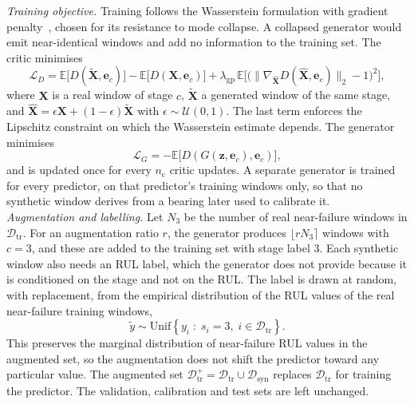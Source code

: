 \textit{Training objective.} Training follows the Wasserstein
formulation with gradient penalty~\cite{NIPS2017_892c3b1c}, chosen for
its resistance to mode collapse. A collapsed generator would emit
near-identical windows and add no information to the training set.
The critic minimises
\begin{equation}
  \mathcal{L}_{D} =
  \mathbb{E}\big[ D(\tilde{\mathbf{X}}, \mathbf{e}_c) \big]
  - \mathbb{E}\big[ D(\mathbf{X}, \mathbf{e}_c) \big]
  + \lambda_{\mathrm{gp}}\,
  \mathbb{E}\Big[ \big( \lVert \nabla_{\hat{\mathbf{X}}}
  D(\hat{\mathbf{X}}, \mathbf{e}_c) \rVert_2 - 1 \big)^2 \Big],
  \label{eq:critic_loss}
\end{equation}
where $\mathbf{X}$ is a real window of stage $c$, $\tilde{\mathbf{X}}$
a generated window of the same stage, and
$\hat{\mathbf{X}} = \epsilon \mathbf{X} + (1-\epsilon)
\tilde{\mathbf{X}}$ with $\epsilon \sim \mathcal{U}(0,1)$. The last
term enforces the Lipschitz constraint on which the Wasserstein
estimate depends. The generator minimises
\begin{equation}
  \mathcal{L}_{G} =
  - \mathbb{E}\big[ D(G(\mathbf{z}, \mathbf{e}_c), \mathbf{e}_c) \big],
  \label{eq:gen_loss}
\end{equation}
and is updated once for every $n_{\mathrm{c}}$ critic updates. A
separate generator is trained for every predictor, on that predictor's
training windows only, so that no synthetic window derives from a
bearing later used to calibrate it.\\

\textit{Augmentation and labelling.} Let $N_3$ be the number of real
near-failure windows in $\mathcal{D}_{\mathrm{tr}}$. For an
augmentation ratio $r$, the generator produces
$\lfloor r N_3 \rceil$ windows with $c = 3$, and these are added to the
training set with stage label 3. Each synthetic window also needs an
RUL label, which the generator does not provide because it is
conditioned on the stage and not on the RUL. The label is drawn at
random, with replacement, from the empirical distribution of the RUL
values of the real near-failure training windows,
\begin{equation}
  \tilde{y} \sim \mathrm{Unif}\left\{ y_i \;:\; s_i = 3,\;
  i \in \mathcal{D}_{\mathrm{tr}} \right\}.
  \label{eq:syn_label}
\end{equation}
This preserves the marginal distribution of near-failure RUL values in
the augmented set, so the augmentation does not shift the predictor
toward any particular value. The augmented set
$\mathcal{D}_{\mathrm{tr}}^{+} = \mathcal{D}_{\mathrm{tr}} \cup
\mathcal{D}_{\mathrm{syn}}$ replaces $\mathcal{D}_{\mathrm{tr}}$ for
training the predictor. The validation, calibration and test sets are
left unchanged.

